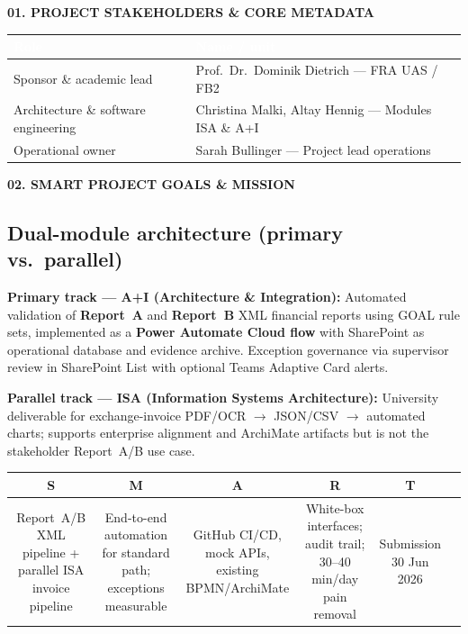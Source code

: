 \documentclass[11pt,a4paper]{article}
\newcommand{\sectiontitle}[1]{%
  \vspace{1.2em}%
  {\color{ISAAIBlue}\bfseries\MakeUppercase{#1}}%
  \vspace{0.4em}\par
}
\begin{document}
\sectiontitle{01. Project stakeholders \& core metadata}

\begin{tabular}{@{}p{}p{}@{}}
\toprule
\rowcolor{ISAAIBlue}
\textcolor{white}{\textbf{Role}} & \textcolor{white}{\textbf{Name / unit}} \\
\midrule
Sponsor \& academic lead & Prof.\ Dr.\ Dominik Dietrich --- FRA UAS / FB2 \\
Architecture \& software engineering & Christina Malki, Altay Hennig --- Modules ISA \& A+I \\
Operational owner & Sarah Bullinger --- Project lead operations \\
\bottomrule
\end{tabular}

\sectiontitle{02. SMART project goals \& mission}

\subsection*{Dual-module architecture (primary vs.\ parallel)}

\textbf{Primary track --- A+I (Architecture \& Integration):} Automated validation of \textbf{Report~A} and \textbf{Report~B} XML financial reports using GOAL rule sets, implemented as a \textbf{Power Automate Cloud flow} with SharePoint as operational database and evidence archive. Exception governance via supervisor review in SharePoint List with optional Teams Adaptive Card alerts.

\textbf{Parallel track --- ISA (Information Systems Architecture):} University deliverable for exchange-invoice PDF/OCR $\rightarrow$ JSON/CSV $\rightarrow$ automated charts; supports enterprise alignment and ArchiMate artifacts but is not the stakeholder Report~A/B use case.

\vspace{0.6em}
\begin{center}
\begin{tabular}{@{}cccccc@{}}
\toprule
\textbf{S} & \textbf{M} & \textbf{A} & \textbf{R} & \textbf{T} \\
\midrule
\begin{minipage}[t]{0.16\textwidth}\small Report~A/B XML pipeline + parallel ISA invoice pipeline\end{minipage} &
\begin{minipage}[t]{0.16\textwidth}\small End-to-end automation for standard path; exceptions measurable\end{minipage} &
\begin{minipage}[t]{0.16\textwidth}\small GitHub CI/CD, mock APIs, existing BPMN/ArchiMate\end{minipage} &
\begin{minipage}[t]{0.16\textwidth}\small White-box interfaces; audit trail; 30--40 min/day pain removal\end{minipage} &
\begin{minipage}[t]{0.16\textwidth}\small Submission 30 Jun 2026\end{minipage} \\
\bottomrule
\end{tabular}
\end{center}
\end{document}
